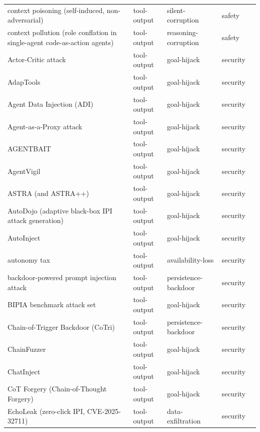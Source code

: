 \begin{longtable}{@{}>{\raggedright\arraybackslash}p{}llll@{}}
context poisoning (self-induced, non-adversarial) & tool-output & silent-corruption & safety & \cite{chen-2026-unlocking} \\
context pollution (role conflation in single-agent code-as-action agents) & tool-output & reasoning-corruption & safety & \cite{fei-2026-codedelegator} \\
Actor-Critic attack & tool-output & goal-hijack & security & \cite{shi-2025-lessons} \\
AdapTools & tool-output & goal-hijack & security & \cite{wang-2026-adaptools} \\
Agent Data Injection (ADI) & tool-output & goal-hijack & security & \cite{choi-2026-agent} \\
Agent-as-a-Proxy attack & tool-output & goal-hijack & security & \cite{isbarov-2026-bypassing} \\
AGENTBAIT & tool-output & goal-hijack & security & \cite{wu-2026-bots} \\
AgentVigil & tool-output & goal-hijack & security & \cite{wang-2025-agentvigilb} \\
ASTRA (and ASTRA++) & tool-output & goal-hijack & security & \cite{pandya-2025-may} \\
AutoDojo (adaptive black-box IPI attack generation) & tool-output & goal-hijack & security & \cite{ma-2026-autodojo} \\
AutoInject & tool-output & goal-hijack & security & \cite{chen-2026-learning} \\
autonomy tax & tool-output & availability-loss & security & \cite{li-2026-autonomy} \\
backdoor-powered prompt injection attack & tool-output & persistence-backdoor & security & \cite{chen-2025-backdoorpowered} \\
BIPIA benchmark attack set & tool-output & goal-hijack & security & \cite{yi-2023-benchmarking} \\
Chain-of-Trigger Backdoor (CoTri) & tool-output & persistence-backdoor & security & \cite{qiu-2025-chainoftrigger} \\
ChainFuzzer & tool-output & goal-hijack & security & \cite{wu-2026-chainfuzzer} \\
ChatInject & tool-output & goal-hijack & security & \cite{chang-2025-chatinject} \\
CoT Forgery (Chain-of-Thought Forgery) & tool-output & goal-hijack & security & \cite{ye-2026-prompt} \\
EchoLeak (zero-click IPI, CVE-2025-32711) & tool-output & data-exfiltration & security & \cite{reddy-2025-echoleak} \\

\end{longtable}
